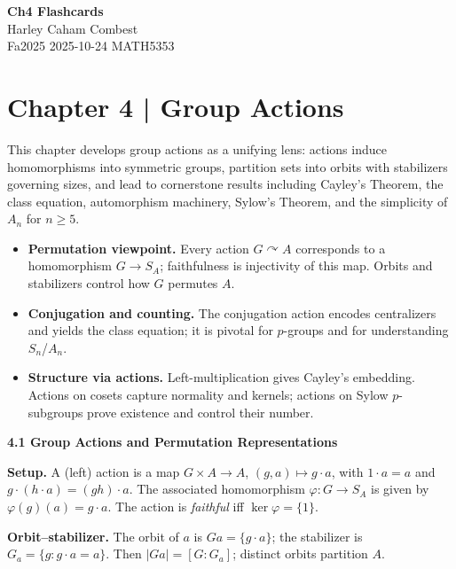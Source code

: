 \documentclass[11pt]{article}
\theoremstyle{definition}
\begin{document}
\begin{center}
\Large\textbf{Ch4 Flashcards} \\
\large Harley Caham Combest \\
\large Fa2025 2025-10-24 MATH5353
\end{center}

\newpage

\dotfill
\section*{Chapter 4 | Group Actions}
\dotfill

\newpage

This chapter develops group actions as a unifying lens: actions induce homomorphisms into symmetric groups, partition sets into orbits with stabilizers governing sizes, and lead to cornerstone results including Cayley’s Theorem, the class equation, automorphism machinery, Sylow’s Theorem, and the simplicity of $A_n$ for $n\ge 5$.

\begin{itemize}
\item \textbf{Permutation viewpoint.} Every action $G\curvearrowright A$ corresponds to a homomorphism $G\to S_A$; faithfulness is injectivity of this map. Orbits and stabilizers control how $G$ permutes $A$.
\item \textbf{Conjugation and counting.} The conjugation action encodes centralizers and yields the class equation; it is pivotal for $p$-groups and for understanding $S_n$/$A_n$.
\item \textbf{Structure via actions.} Left-multiplication gives Cayley’s embedding. Actions on cosets capture normality and kernels; actions on Sylow $p$-subgroups prove existence and control their number.
\end{itemize}

\newpage

\textbf{4.1 Group Actions and Permutation Representations}

\newpage

\medskip
\textbf{Setup.} A (left) action is a map $G\times A\to A$, $(g,a)\mapsto g\cdot a$, with $1\cdot a=a$ and $g\cdot(h\cdot a)=(gh)\cdot a$. The associated homomorphism $\varphi:G\to S_A$ is given by $\varphi(g)(a)=g\cdot a$. The action is \emph{faithful} iff $\ker\varphi=\{1\}$.

\medskip
\textbf{Orbit--stabilizer.} The orbit of $a$ is $Ga=\{g\cdot a\}$; the stabilizer is $G_a=\{g:g\cdot a=a\}$. Then $|Ga|=[G:G_a]$; distinct orbits partition $A$.
\end{document}
